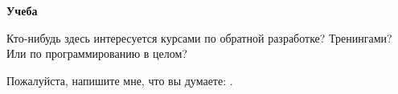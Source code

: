 \vspace*{\fill}

\large \textbf{Учеба}

\bigskip
\bigskip
\bigskip

Кто-нибудь здесь интересуется курсами по обратной разработке? Тренингами?
Или по программированию в целом?

Пожалуйста, напишите мне, что вы думаете: \EMAIL.

\normalsize

\bigskip
\bigskip
\bigskip

\vspace*{\fill}
\vfill
